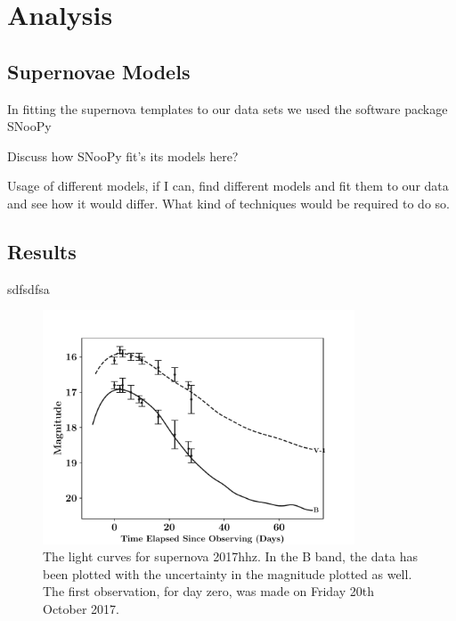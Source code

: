 \documentclass[twocolumn]{revtex4}
\begin{document}
\vspace{-3ex}
\section{Analysis}
\label{analysis}
\vspace{-2ex}
\subsection{Supernovae Models}
\vspace{-2ex}
In fitting the supernova templates to our data sets we used the software package SNooPy

Discuss how SNooPy fit's its models here? \cite{car_snoopy}

Usage of different models, if I can, find different models and fit them to our data and see how it would differ. What kind of techniques would be required to do so. 


\vspace{-3ex}
\subsection{Results}
\vspace{-2ex}

sdfsdfsa

\begin{figure}[!h]
\begin{center}
\includegraphics[width=9.25cm]{results/2017hhz}
\caption[]{The light curves for supernova 2017hhz. In the B band, the data has been plotted with the uncertainty in the magnitude plotted as well. The first observation, for day zero, was made on Friday 20th October 2017.}
\label{2017hhz-data}
\end{center}
\end{figure}
\end{document}

